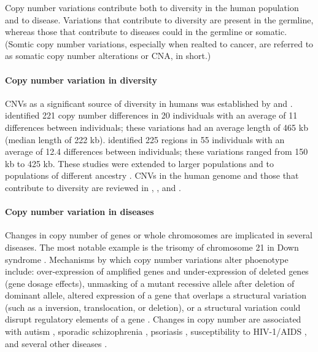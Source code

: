 Copy number variations contribute both to diversity in the human
population and to disease.
Variations that contribute to diversity are present in the germline,
whereas those that contribute to diseases could in the germline or
somatic. (Somtic copy number variations, especially when realted to
cancer, are referred to as somatic copy number alterations or
CNA, in short.)

\paragraph{Copy number variation in diversity}
CNVs as a significant source of diversity in humans was established by
\cite{sebat2004large} and \cite{iafrate2004detection}.
%
\cite{sebat2004large} identified 221 copy number differences in 20
individuals with an average of 11 differences between individuals; these
variations had an average length of 465 kb (median length of 222 kb).
%
\cite{iafrate2004detection} identified 225 regions in 55 individuals
with an average of 12.4 differences between individuals; these
variations ranged from 150 kb to 425 kb.
%
These studies were extended to larger populations and to populations of
different ancestry \citep{redon2006global,li2009whole}.  CNVs in the
human genome and those that contribute to diversity are reviewed in
\cite{freeman2006copy}, \cite{feuk2006structural}, and
\cite{zarrei2015copy}.

\paragraph{Copy number variation in diseases}
Changes in copy number of genes or whole chromosomes are implicated in
several diseases. The most notable example is the trisomy of chromosome
21 in Down syndrome \citep{antonarakis2004chromosome}.
%
Mechanisms by which copy number variations alter phoenotype include:
over-expression of amplified genes and under-expression of deleted genes
(gene dosage effects), unmasking of a mutant recessive allele after
deletion of dominant allele, altered expression of a gene that overlaps
a structural variation (such as a inversion, translocation, or
deletion), or a structural variation could disrupt regulatory elements
of a gene \citep{feuk2006structural}.
%
Changes in copy number are associated with autism
\citep{sebat2007strong}, sporadic schizophrenia \citep{xu2008strong},
psoriasis \citep{hollox2008psoriasis}, susceptibility to HIV-1/AIDS
\citep{gonzalez2005influence}, and several other diseases
\citep{stankiewicz2010structural,fanciulli2010gene}.

